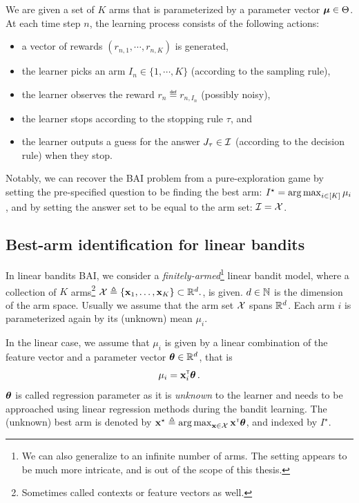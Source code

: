 \begin{definition}\label{def:mab.pure}
\begin{leftbar}[defnbar]
	We are given a set of $K$ arms that is parameterized by a parameter vector ${\boldsymbol \mu}\in\Theta$. At each time step $n$, the learning process consists of the following actions:
\begin{itemize}
	\item a vector of rewards $(r_{n,1}, \cdots, r_{n,K})$ is generated,
	\item the learner picks an arm $I_n \in \{1,\cdots,K\}$ (according to the sampling rule),
	\item the learner observes the reward $r_n \eqdef r_{n,I_n}$ (possibly noisy),
	\item the learner stops according to the stopping rule $\tau$, and
	\item the learner outputs a guess for the answer $J_\tau \in \mathcal{I}$ (according to the decision rule) when they stop.
\end{itemize}
\end{leftbar}
\end{definition}

Notably, we can recover the BAI problem from a pure-exploration game by setting the pre-specified question to be finding the best arm: $I^\star = \operatorname*{arg\,max}_{i\in[K]}\mu_i$, and by setting the answer set to be equal to the arm set: $\mathcal{I} = \mathcal{X}$.

\subsection{Best-arm identification for linear bandits}\label{sec:mab.extensions.linear}

In linear bandits BAI, we consider a \emph{finitely-armed}\footnote{We can also generalize to an infinite number of arms. The setting appears to be much more intricate, and is out of the scope of this thesis.} linear bandit model, where a collection of $K$ arms\footnote{Sometimes called contexts or feature vectors as well.} $\mathcal{X}\triangleq\{{\bf x}_1,\ldots,{\bf x}_K\}\subset \mathbb{R}^d.$, is given. $d\in{\mathbb N}$ is the dimension of the arm space. Usually we assume that the arm set $\mathcal{X}$ spans $\mathbb{R}^d$. Each arm $i$ is parameterized again by its (unknown) mean $\mu_i$. 

In the linear case, we assume that $\mu_i$ is given by a linear combination of the feature vector and a parameter vector ${\boldsymbol \theta}\in\mathbb{R}^d$, that is 
\[
    \mu_i = {\bf x}_i^\mathsf{\scriptscriptstyle T}{\boldsymbol \theta}\,.
\]
${\boldsymbol \theta}$ is called regression parameter as it is \emph{unknown} to the learner and needs to be approached using linear regression methods during the bandit learning. The (unknown) best arm is denoted by ${\bf x}^\star\triangleq\operatorname*{arg\,max}_{{\bf x}\in\mathcal{X}}{\bf x}^\mathsf{\scriptscriptstyle T}{\boldsymbol \theta}$, and indexed by $I^\star$.


